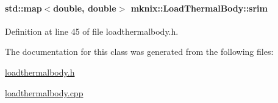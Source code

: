 \paragraph[{srim}]{\setlength{\rightskip}{0pt plus 5cm}std\+::map$<$double, double$>$ mknix\+::\+Load\+Thermal\+Body\+::srim\hspace{0.3cm}{\ttfamily [protected]}}\label{classmknix_1_1_load_thermal_body_adb98192e4cdce5830b451f8272a6e20f}


Definition at line 45 of file loadthermalbody.\+h.



The documentation for this class was generated from the following files\+:\begin{DoxyCompactItemize}
\item 
\hyperlink{loadthermalbody_8h}{loadthermalbody.\+h}\item 
\hyperlink{loadthermalbody_8cpp}{loadthermalbody.\+cpp}\end{DoxyCompactItemize}
